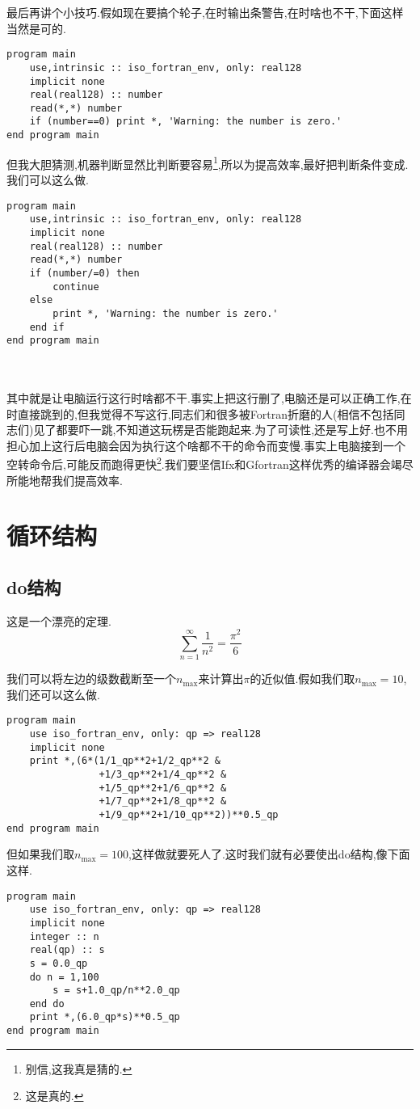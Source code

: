最后再讲个小技巧.假如现在要搞个轮子,在时输出条警告,在时啥也不干,下面这样当然是可的.
\begin{lstlisting}
program main
    use,intrinsic :: iso_fortran_env, only: real128
    implicit none
    real(real128) :: number
    read(*,*) number
    if (number==0) print *, 'Warning: the number is zero.'
end program main
\end{lstlisting}
但我大胆猜测,机器判断显然比判断要容易\footnote{
    别信,这我真是猜的.
},所以为提高效率,最好把判断条件变成.我们可以这么做.\label{use_continue}
\begin{lstlisting}
program main
    use,intrinsic :: iso_fortran_env, only: real128
    implicit none
    real(real128) :: number
    read(*,*) number
    if (number/=0) then
        continue
    else
        print *, 'Warning: the number is zero.'
    end if
end program main
\end{lstlisting}
\mbox{}\\\mbox{}\\
其中就是让电脑运行这行时啥都不干.事实上把这行删了,电脑还是可以正确工作,在时直接跳到的,但我觉得不写这行,同志们和很多被Fortran折磨的人(相信不包括同志们)见了都要吓一跳,不知道这玩楞是否能跑起来.为了可读性,还是写上好.也不用担心加上这行后电脑会因为执行这个啥都不干的命令而变慢.事实上电脑接到一个空转命令后,可能反而跑得更快\footnote{
    这是真的.
}.我们要坚信Ifx和Gfortran这样优秀的编译器会竭尽所能地帮我们提高效率.

\section{循环结构}

\subsection{do结构}\label{do_construct}

这是一个漂亮的定理.
\begin{equation*}
    \sum_{n=1}^{\infty} \frac{1}{n^2} = \frac{\pi^2}{6}
\end{equation*}

我们可以将左边的级数截断至一个$n_{\text{max}}$来计算出$\pi$的近似值.假如我们取$n_{\text{max}}=10$,我们还可以这么做.
\begin{lstlisting}
program main
    use iso_fortran_env, only: qp => real128
    implicit none
    print *,(6*(1/1_qp**2+1/2_qp**2 &
                +1/3_qp**2+1/4_qp**2 &
                +1/5_qp**2+1/6_qp**2 &
                +1/7_qp**2+1/8_qp**2 &
                +1/9_qp**2+1/10_qp**2))**0.5_qp
end program main
\end{lstlisting}
但如果我们取$n_{\text{max}}=100$,这样做就要死人了.这时我们就有必要使出do结构,像下面这样.\newpage
\begin{lstlisting}
program main
    use iso_fortran_env, only: qp => real128
    implicit none
    integer :: n
    real(qp) :: s
    s = 0.0_qp
    do n = 1,100
        s = s+1.0_qp/n**2.0_qp
    end do
    print *,(6.0_qp*s)**0.5_qp
end program main
\end{lstlisting}

